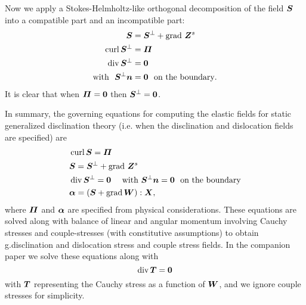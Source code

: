 \documentclass[11pt,letterpaper]{article}
\begin{document}
Now we apply a Stokes-Helmholtz-like orthogonal decomposition of the field $\bfS$ into a compatible part and an incompatible part:
\begin{eqnarray}\label{eqn:S_decomposition}
\begin{aligned}
\bfS &= \bfS^{\perp} + \grad \, \bfZ^{s} \\ 
\curl \bfS^{\perp} &= \bfPi \\
\divergence\bfS^{\perp} &= \textbf{0} \\  
\mbox{with} \ \ \bfS^{\perp}\bfn &= \textbf{0} \ \ \mbox{on the boundary}.
\end{aligned}
\end{eqnarray}
It is clear that when $\bfPi = \textbf{0}$ then $\bfS^{\perp} = \textbf{0}$. 

In summary, the governing equations for computing the elastic fields for static generalized disclination theory (i.e. when the disclination and dislocation fields are specified) are 
\begin{eqnarray}\label{eqn:summary}
\begin{aligned}
&\curl \bfS = \bfPi \\ 
&\bfS = \bfS^{\perp} + \grad \, \bfZ^{s} \\ 
&\divergence\bfS^{\perp} = \textbf{0}  \ \ \ \ 
\mbox{with} \  \bfS^{\perp}\bfn = \textbf{0} \ \ \mbox{on the boundary} \\ 
&\bfalpha = \left( \bfS + \grad\bfW \right) : \bfX,
\end{aligned}
\end{eqnarray}
where $\bfPi$ and $\bfalpha$ are specified from physical considerations. These equations are solved along with balance of linear and angular momentum involving Cauchy stresses and couple-stresses (with constitutive assumptions) to obtain g.disclination and dislocation stress and couple stress fields. In the companion paper \cite{zhang_acharya_puri} we solve these equations along with
\[
\divergence\bfT = \textbf{0}
\]
with $\bfT$ representing the Cauchy stress as a function of $\bfW$, and we ignore couple stresses for simplicity.
\end{document}
